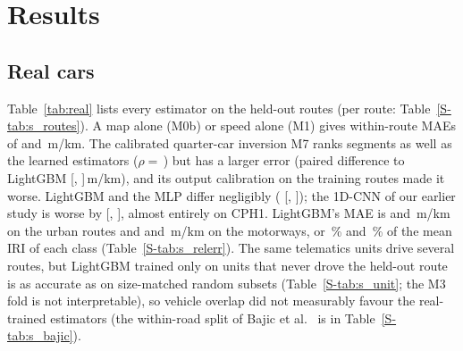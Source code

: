 \section{Results}
\label{sec:results}



\subsection{Real cars}
\label{sec:res_real}
Table~\ref{tab:real} lists every estimator on the held-out routes (per route: Table~\ref{S-tab:s_routes}).
A map alone (M0b) or speed alone (M1) gives within-route MAEs of \vrMapMaeWithin{} and \vrSpeedMaeWithin\,m/km.
The calibrated quarter-car inversion M7 ranks segments as well as the learned estimators ($\rho=$\,\vrInvRhoWithin) but has a larger error (paired difference to LightGBM \vrInvDfive{} [\vrInvDfiveLo, \vrInvDfiveHi]\,m/km), and its output calibration on the training routes made it worse.
LightGBM and the MLP differ negligibly (\vrMlpDfive{} [\vrMlpDfiveLo, \vrMlpDfiveHi]); the 1D-CNN of our earlier study is worse by \vrCnnDfive{} [\vrCnnDfiveLo, \vrCnnDfiveHi], almost entirely on CPH1.
LightGBM's MAE is \vrGbmMaeCphOne{} and \vrGbmMaeCphSix\,m/km on the urban routes and \vrGbmMaeMwThree{} and \vrGbmMaeMwThirteen\,m/km on the motorways, or \reGbmUrban\,\% and \reGbmMotorway\,\% of the mean IRI of each class (Table~\ref{S-tab:s_relerr}).
The same telematics units drive several routes, but LightGBM trained only on units that never drove the held-out route is as accurate as on size-matched random subsets (Table~\ref{S-tab:s_unit}; the M3 fold is not interpretable), so vehicle overlap did not measurably favour the real-trained estimators (the within-road split of Bajic et al.~\cite{bajic2021ml} is in Table~\ref{S-tab:s_bajic}).

